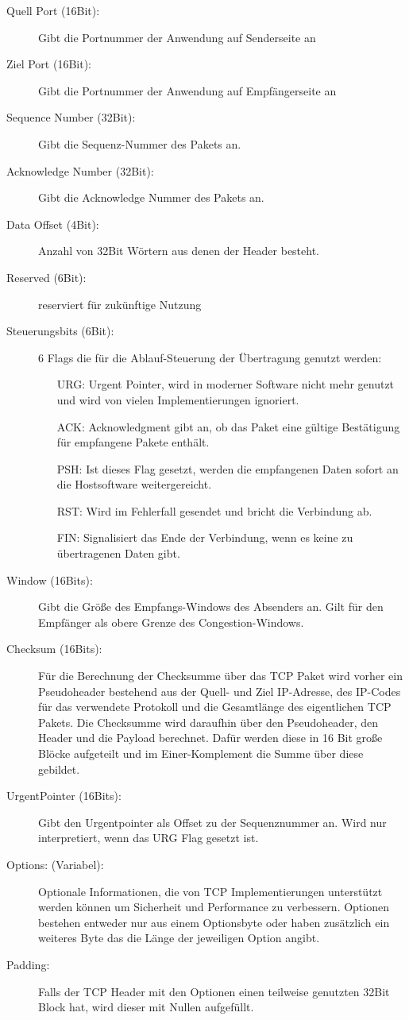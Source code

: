 \begin{description}

\item[Quell Port (16Bit): ] Gibt die Portnummer der Anwendung auf Senderseite an 
\item[Ziel Port (16Bit): ] Gibt die Portnummer der Anwendung auf Empfängerseite an
\item[Sequence Number (32Bit): ] Gibt die Sequenz-Nummer des Pakets an.
\item[Acknowledge Number (32Bit): ] Gibt die Acknowledge Nummer des Pakets an.
\item[Data Offset (4Bit): ] Anzahl von 32Bit Wörtern aus denen der Header besteht. 
\item[Reserved (6Bit): ] reserviert für zukünftige Nutzung
\item[Steuerungsbits (6Bit): ] 6 Flags die für die Ablauf-Steuerung der Übertragung genutzt werden: 
\begin{itemize}
\item[URG: ] Urgent Pointer, wird in moderner Software nicht mehr genutzt und wird von vielen Implementierungen ignoriert. 
\item[ACK: ] Acknowledgment gibt an, ob das Paket eine gültige Bestätigung für empfangene Pakete enthält.
\item[PSH: ] Ist dieses Flag gesetzt, werden die empfangenen Daten sofort an die Hostsoftware weitergereicht. 
\item[RST: ] Wird im Fehlerfall gesendet und bricht die Verbindung ab. 
\item[FIN: ] Signalisiert das Ende der Verbindung, wenn es keine zu übertragenen Daten gibt. 
\end{itemize}
\item[Window (16Bits): ] Gibt die Größe des Empfangs-Windows des Absenders an. Gilt für den Empfänger als obere Grenze des Congestion-Windows.
\item[Checksum (16Bits): ] Für die Berechnung der Checksumme über das TCP Paket wird vorher ein Pseudoheader bestehend aus der Quell- und Ziel IP-Adresse, des IP-Codes für das verwendete Protokoll und die Gesamtlänge des eigentlichen TCP Pakets. Die Checksumme wird daraufhin über den Pseudoheader, den Header und die Payload berechnet. Dafür werden diese in 16 Bit große Blöcke aufgeteilt und im Einer-Komplement die Summe über diese gebildet. 
\item[UrgentPointer (16Bits): ] Gibt den Urgentpointer als Offset zu der Sequenznummer an. Wird nur interpretiert, wenn das URG Flag gesetzt ist.\
\item[Options: (Variabel): ]  Optionale Informationen, die von TCP Implementierungen unterstützt werden können um Sicherheit und Performance zu verbessern. Optionen bestehen entweder nur aus einem Optionsbyte oder haben zusätzlich ein weiteres Byte das die Länge der jeweiligen Option angibt. 
\item[Padding: ] Falls der TCP Header mit den Optionen einen teilweise genutzten 32Bit Block hat, wird dieser mit Nullen aufgefüllt. 
\end{description}

